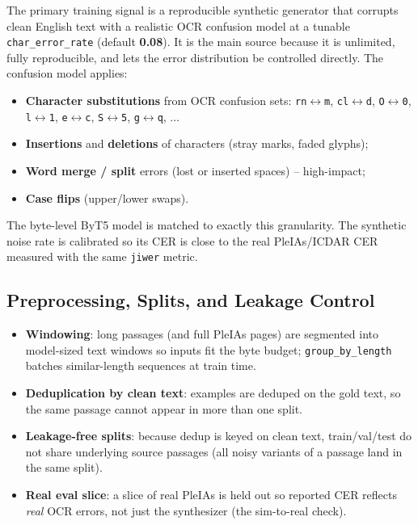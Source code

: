 \documentclass[12pt,a4paper]{article}
\begin{document}
The primary training signal is a reproducible synthetic generator that corrupts clean English text with a realistic OCR confusion model at a tunable \texttt{char\_error\_rate} (default \textbf{0.08}). It is the main source because it is unlimited, fully reproducible, and lets the error distribution be controlled directly. The confusion model applies:
\begin{itemize}\setlength\itemsep{0.1em}
  \item \textbf{Character substitutions} from OCR confusion sets: \texttt{rn$\leftrightarrow$m}, \texttt{cl$\leftrightarrow$d}, \texttt{O$\leftrightarrow$0}, \texttt{l$\leftrightarrow$1}, \texttt{e$\leftrightarrow$c}, \texttt{S$\leftrightarrow$5}, \texttt{g$\leftrightarrow$q}, $\dots$
  \item \textbf{Insertions} and \textbf{deletions} of characters (stray marks, faded glyphs);
  \item \textbf{Word merge / split} errors (lost or inserted spaces) -- high-impact;
  \item \textbf{Case flips} (upper/lower swaps).
\end{itemize}
The byte-level ByT5 model is matched to exactly this granularity. The synthetic noise rate is calibrated so its CER is close to the real PleIAs/ICDAR CER measured with the same \texttt{jiwer} metric.

\subsection{Preprocessing, Splits, and Leakage Control}

\begin{itemize}\setlength\itemsep{0.15em}
  \item \textbf{Windowing}: long passages (and full PleIAs pages) are segmented into model-sized text windows so inputs fit the byte budget; \texttt{group\_by\_length} batches similar-length sequences at train time.
  \item \textbf{Deduplication by clean text}: examples are deduped on the gold text, so the same passage cannot appear in more than one split.
  \item \textbf{Leakage-free splits}: because dedup is keyed on clean text, train/val/test do not share underlying source passages (all noisy variants of a passage land in the same split).
  \item \textbf{Real eval slice}: a slice of real PleIAs is held out so reported CER reflects \emph{real} OCR errors, not just the synthesizer (the sim-to-real check).
\end{itemize}
\end{document}
